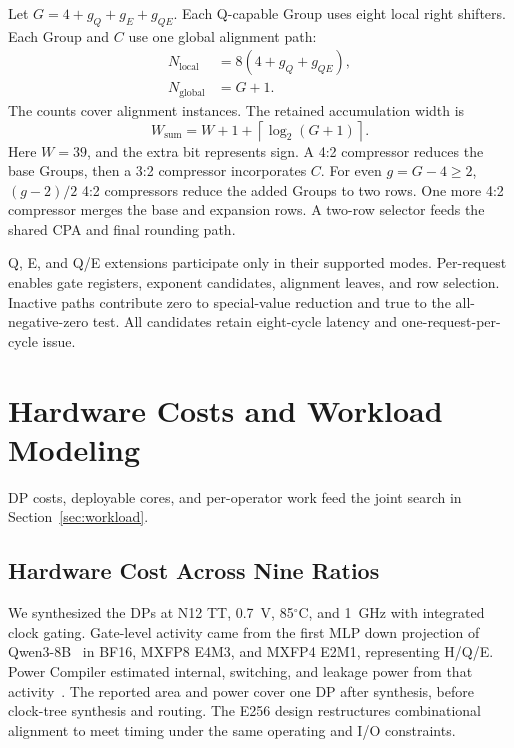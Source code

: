 \documentclass[conference,9pt,letterpaper]{IEEEtran}
\begin{document}
Let $G=4+g_Q+g_E+g_{QE}$. Each Q-capable Group uses eight local right shifters. Each Group and $C$ use one global alignment path:
\begin{equation}
\begin{aligned}
N_{\mathrm{local}}&=8(4+g_Q+g_{QE}),\\
N_{\mathrm{global}}&=G+1.
\end{aligned}
\label{eq:shifter_count}
\end{equation}
The counts cover alignment instances. The retained accumulation width is
\begin{equation}
W_{\mathrm{sum}}=W+1+\left\lceil\log_2(G+1)\right\rceil.
\label{eq:expanded_sum_width}
\end{equation}
Here $W=39$, and the extra bit represents sign. A 4:2 compressor reduces the base Groups, then a 3:2 compressor incorporates $C$. For even $g=G-4\ge2$, $(g-2)/2$ 4:2 compressors reduce the added Groups to two rows. One more 4:2 compressor merges the base and expansion rows. A two-row selector feeds the shared CPA and final rounding path.

Q, E, and Q/E extensions participate only in their supported modes. Per-request enables gate registers, exponent candidates, alignment leaves, and row selection. Inactive paths contribute zero to special-value reduction and true to the all-negative-zero test. All candidates retain eight-cycle latency and one-request-per-cycle issue.

\section{Hardware Costs and Workload Modeling}
\label{sec:evaluation}

DP costs, deployable cores, and per-operator work feed the joint search in Section~\ref{sec:workload}.

\subsection{Hardware Cost Across Nine Ratios}
\label{sec:eval_setup}
\label{sec:lowp_costs}

We synthesized the DPs at N12 TT, 0.7~V, 85$^\circ$C, and 1~GHz with integrated clock gating. Gate-level activity came from the first MLP down projection of Qwen3-8B~\cite{qwen3technicalreport} in BF16, MXFP8 E4M3, and MXFP4 E2M1, representing H/Q/E. Power Compiler estimated internal, switching, and leakage power from that activity~\cite{synopsysActivityPower}. The reported area and power cover one DP after synthesis, before clock-tree synthesis and routing. The E256 design restructures combinational alignment to meet timing under the same operating and I/O constraints.
\end{document}
